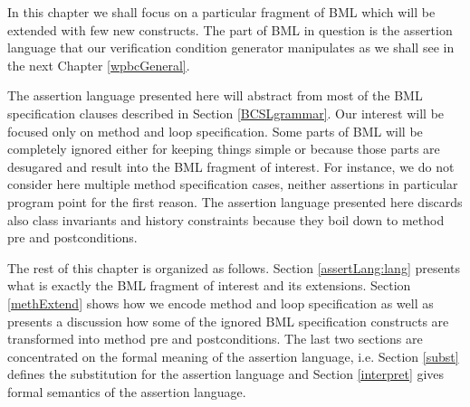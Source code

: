 In this chapter we shall focus on 
 a particular fragment of BML which will be extended with 
few new constructs.  The part of BML in question  
is the assertion language that our  verification condition generator manipulates
 as we shall see in the next Chapter \ref{wpbcGeneral}.



The assertion language presented here will abstract from most of the BML specification clauses described in Section \ref{BCSLgrammar}.
Our interest will be focused only on method and loop specification.
Some parts of BML will be completely ignored  either for keeping things simple or because those parts
are desugared and result into the BML fragment of interest. For instance, 
we do not consider here multiple method specification cases, neither assertions in particular program 
point for the first reason. The assertion language presented here discards also class invariants and
 history constraints because  they boil down to method pre and postconditions.

The rest of this chapter is organized as follows. Section \ref{assertLang:lang} presents
what is exactly the BML fragment of interest and its extensions.
Section \ref{methExtend} shows how we encode method and loop specification as well as presents a discussion
how some of the ignored BML specification constructs are transformed into method pre and postconditions.
The last two sections are concentrated on the formal meaning of the assertion language, i.e.
Section \ref{subst} defines the substitution for the assertion language and 
 Section \ref{interpret} gives formal semantics of the assertion language.


